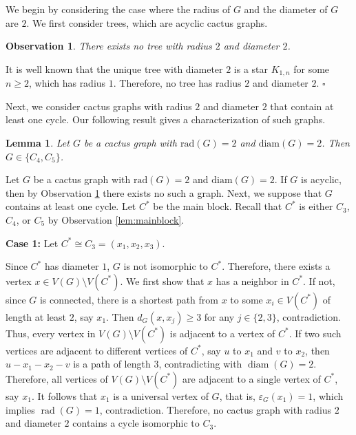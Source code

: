 \documentclass[12pt]{article}
\newtheorem{lemma}[theorem]{Lemma}
\newtheorem{observation}[theorem]{Observation}
\newcommand{\proof}{\noindent{\bf Proof.\ }}
\newcommand{\qed}{\hfill $\square$ \bigskip}
\newcommand{\ie}{that is}
\begin{document}
We begin by considering the case where the radius of $G$ and the diameter of $G$ are $2$. We first consider trees, which are acyclic cactus graphs. 

\begin{observation}\label{pro1}
There exists no tree with radius $2$ and diameter $2$. 
\end{observation}

\proof
It is well known that the unique tree with diameter $2$ is a star $K_{1,n}$ for some $n\ge 2$, which has radius $1$. Therefore, no tree has radius $2$ and diameter $2$.
\qed

Next, we consider cactus graphs with radius $2$ and diameter $2$ that contain at least one cycle. Our following result gives a characterization of such graphs.

\begin{lemma}\label{pro2}
Let \( G \) be a cactus graph with $\mathrm{rad}(G) = 2$  and  $\mathrm{diam}(G) = 2$. Then \( G \in \{ C_4, C_5 \} \).
\end{lemma}

\proof Let \( G \) be a cactus graph with $\mathrm{rad}(G) = 2$  and  $\mathrm{diam}(G) = 2$. If $G$ is acyclic, then by Observation \ref{pro1} there exists no such a graph. Next, we suppose that \( G \) contains at least one cycle. Let $C^*$ be the main block. Recall that $C^*$ is either $C_3$, $C_4$, or $C_5$ by Observation \ref{lem:mainblock}.


\textbf{Case 1:} Let $C^* \cong C_3=(x_1,x_2,x_3)$. 

Since $C^*$ has diameter $1$, $G$ is not isomorphic to $C^*$. Therefore, there exists a vertex $x \in V(G)\setminus V(C^*)$.
We first show that $x$ has a neighbor in $C^*$. If not, since $G$ is connected, there is a shortest path from $x$ to some $x_i \in V(C^*)$ of length at least $2$, say $x_1$.
Then $d_G(x,x_j)\ge 3$ for any $j \in \{2,3\}$, contradiction.
Thus, every vertex in $V(G)\setminus V(C^*)$ is adjacent to a vertex of $C^*$. 
If two such vertices are adjacent to different vertices of $C^*$, say $u$ to $x_1$ and $v$ to $x_2$, then $u-x_1-x_2-v$ is a path of length $3$, contradicting with $\operatorname{diam}(G)=2$. 
Therefore, all vertices of $V(G)\setminus V(C^*)$ are adjacent to a single vertex of $C^*$, say $x_1$.
It follows that $x_1$ is a universal vertex of $G$, \ie, $\varepsilon_G(x_1)=1$, which implies $\operatorname{rad}(G)=1$, contradiction. Therefore, no cactus graph with radius $2$ and diameter $2$ contains a cycle isomorphic to $C_3$.
\end{document}
